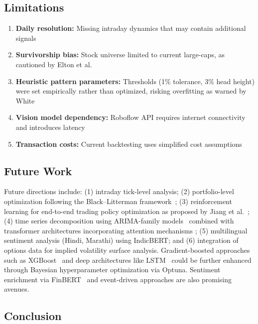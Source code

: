 \documentclass[12pt,a4paper]{article}
\begin{document}
\subsection{Limitations}

\begin{enumerate}[label=\arabic*.]
    \item \textbf{Daily resolution:} Missing intraday dynamics that may contain additional signals
    \item \textbf{Survivorship bias:} Stock universe limited to current large-caps, as cautioned by Elton et al.~\cite{elton1996survivorship}
    \item \textbf{Heuristic pattern parameters:} Thresholds (1\% tolerance, 3\% head height) were set empirically rather than optimized, risking overfitting as warned by White~\cite{white2000reality}
    \item \textbf{Vision model dependency:} Roboflow API requires internet connectivity and introduces latency
    \item \textbf{Transaction costs:} Current backtesting uses simplified cost assumptions
\end{enumerate}

\subsection{Future Work}

Future directions include: (1) intraday tick-level analysis; (2) portfolio-level optimization following the Black--Litterman framework~\cite{black1992global}; (3) reinforcement learning for end-to-end trading policy optimization as proposed by Jiang et al.~\cite{jiang2017deep}; (4) time series decomposition using ARIMA-family models~\cite{box2015time} combined with transformer architectures incorporating attention mechanisms \cite{vaswani2017attention}; (5) multilingual sentiment analysis (Hindi, Marathi) using IndicBERT; and (6) integration of options data for implied volatility surface analysis. Gradient-boosted approaches such as XGBoost~\cite{chen2016xgboost} and deep architectures like LSTM~\cite{hochreiter1997long} could be further enhanced through Bayesian hyperparameter optimization via Optuna. Sentiment enrichment via FinBERT~\cite{araci2019finbert} and event-driven approaches \cite{ding2015deep} are also promising avenues.

\subsection{Conclusion}
\end{document}
